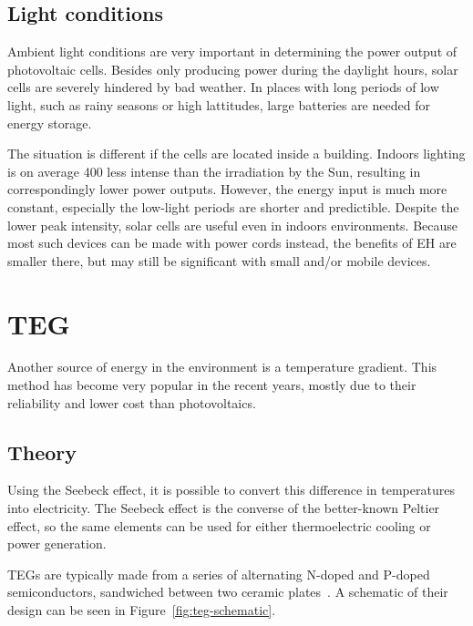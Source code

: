 \documentclass[a4paper,10pt]{article}
\begin{document}
\subsection{Light conditions}

Ambient light conditions are very important in determining the power output of photovoltaic cells. Besides only producing power during the daylight hours, solar cells are severely hindered by bad weather. In places with long periods of low light, such as rainy seasons or high lattitudes, large batteries are needed for energy storage. 

The situation is different if the cells are located inside a building. Indoors lighting is on average 400 less intense than the irradiation by the Sun, resulting in correspondingly lower power outputs. However, the energy input is much more constant, especially the low-light periods are shorter and predictible. Despite the lower peak intensity, solar cells are useful even in indoors environments. Because most such devices can be made with power cords instead, the benefits of \ac{EH} are smaller there, but may still be significant with small and/or mobile devices. 

\section{\acl{TEG}}

Another source of energy in the environment is a temperature gradient. This method has become very popular in the recent years, mostly due to their reliability and lower cost than photovoltaics.

\subsection{Theory}

Using the Seebeck effect, it is possible to convert this difference in temperatures into electricity.  The Seebeck effect is the converse of the better-known Peltier effect, so the same elements can be used for either thermoelectric cooling or power generation. 

\acp{TEG} are typically made from a series of alternating N-doped and P-doped semiconductors, sandwiched between two ceramic plates~\cite{Salerno10}. A schematic of their design can be seen in Figure~\ref{fig:teg-schematic}.
\end{document}
